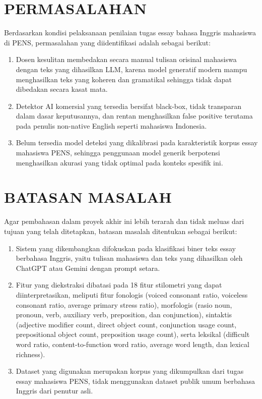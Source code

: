 
\section{PERMASALAHAN}

Berdasarkan kondisi pelaksanaan penilaian tugas essay bahasa Inggris mahasiswa di PENS, permasalahan yang diidentifikasi adalah sebagai berikut:
\begin{enumerate}[label=\arabic*., leftmargin=*]
  \item Dosen kesulitan membedakan secara manual tulisan orisinal mahasiswa dengan teks yang dihasilkan LLM, karena model generatif modern mampu menghasilkan teks yang koheren dan gramatikal sehingga tidak dapat dibedakan secara kasat mata.
  \item Detektor AI komersial yang tersedia bersifat black-box, tidak transparan dalam dasar keputusannya, dan rentan menghasilkan false positive terutama pada penulis non-native English seperti mahasiswa Indonesia.
  \item Belum tersedia model deteksi yang dikalibrasi pada karakteristik korpus essay mahasiswa PENS, sehingga penggunaan model generik berpotensi menghasilkan akurasi yang tidak optimal pada konteks spesifik ini.
\end{enumerate}


\ifbukupa
\section{BATASAN MASALAH}

Agar pembahasan dalam proyek akhir ini lebih terarah dan tidak meluas dari tujuan yang telah ditetapkan, batasan masalah ditentukan sebagai berikut:
\begin{enumerate}[label=\arabic*., leftmargin=*]
    \item Sistem yang dikembangkan difokuskan pada klasifikasi biner teks essay berbahasa Inggris, yaitu tulisan mahasiswa dan teks yang dihasilkan oleh ChatGPT atau Gemini dengan prompt setara.
    \item Fitur yang diekstraksi dibatasi pada 18 fitur stilometri yang dapat diinterpretasikan, meliputi fitur fonologis (voiced consonant ratio, voiceless consonant ratio, average primary stress ratio), morfologis (rasio noun, pronoun, verb, auxiliary verb, preposition, dan conjunction), sintaktis (adjective modifier count, direct object count, conjunction usage count, prepositional object count, preposition usage count), serta leksikal (difficult word ratio, content-to-function word ratio, average word length, dan lexical richness).
    \item Dataset yang digunakan merupakan korpus yang dikumpulkan dari tugas essay mahasiswa PENS, tidak menggunakan dataset publik umum berbahasa Inggris dari penutur asli.
\end{enumerate}

